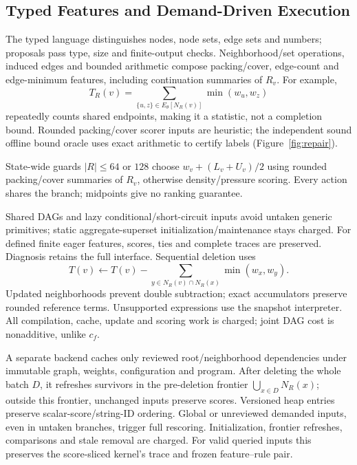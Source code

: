 \subsection{Typed Features and Demand-Driven Execution}
\label{sec:method:features}
The typed language distinguishes nodes, node sets, edge sets and numbers;
proposals pass type, size and finite-output checks. Neighborhood/set
operations, induced edges and bounded arithmetic compose packing/cover, edge-count
and edge-minimum features, including continuation summaries of $R_v$.
For example,
\begin{equation}
 T_R(v)=\sum_{\{u,z\}\in E_\theta[N_R(v)]}\min(w_u,w_z)
 \label{eq:neighbor-structure}
\end{equation}
repeatedly counts shared endpoints, making it a statistic, not a completion
bound. Rounded packing/cover scorer inputs are heuristic; the independent
sound offline bound oracle uses exact arithmetic to certify labels (Figure~\ref{fig:repair}).

State-wide guards $|R|\leq64$ or $128$ choose
$w_v+(L_v+U_v)/2$ using rounded packing/cover summaries of $R_v$,
otherwise density/pressure scoring.
Every action shares the branch; midpoints give no ranking guarantee.

Shared DAGs and lazy conditional/short-circuit inputs avoid untaken generic
primitives; static aggregate-superset initialization/maintenance stays charged.
For defined finite eager features, scores, ties and complete traces are
preserved. Diagnosis retains the full interface. Sequential deletion uses
\begin{equation}
 T(v)\leftarrow T(v)-\sum_{y\in N_R(v)\cap N_R(x)}\min(w_x,w_y).
 \label{eq:incremental-feature}
\end{equation}
Updated neighborhoods prevent double subtraction; exact accumulators
preserve rounded reference terms. Unsupported expressions use the snapshot
interpreter. All compilation, cache, update and scoring work is charged;
joint DAG cost is nonadditive, unlike $c_f$.

A separate backend caches only reviewed root/neighborhood dependencies
under immutable graph, weights, configuration and program. After deleting
the whole batch $D$, it refreshes survivors in the pre-deletion frontier
$\bigcup_{x\in D}N_R(x)$;
outside this frontier, unchanged inputs preserve scores. Versioned heap
entries preserve scalar-score/string-ID ordering. Global or unreviewed
demanded inputs, even in untaken branches, trigger full rescoring.
Initialization, frontier refreshes, comparisons and stale removal are
charged. For valid queried inputs this preserves the score-sliced
kernel's trace and frozen feature--rule pair.

